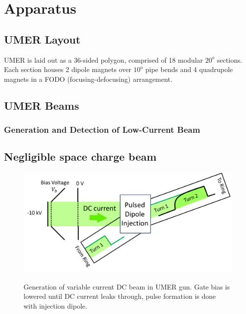 
\renewcommand{\thechapter}{3}

\chapter{Apparatus}
\label{ch:apparatus}

\section{UMER Layout}

UMER is laid out as a 36-sided polygon, comprised of 18 modular $20^o$ sections. Each section houses 2 dipole magnets over $10^o$ pipe bends and 4 quadrupole magnets in a FODO (focusing-defocusing) arrangement.

\section{UMER Beams}
	\subsection{Generation and Detection of Low-Current Beam}
	
	\section{Negligible space charge beam}

\begin{figure}
\begin{center}
\includegraphics[width=\textwidth]{3.figures/DCbeam.png}
\end{center}
\renewcommand{\baselinestretch}{1}
\small\normalsize
\begin{quote}
\caption[]{Generation of variable current DC beam in UMER gun. Gate bias is lowered until DC current leaks through, pulse formation is done with injection dipole.}
\label{fig:DCbeamcartoon}
\end{quote}
\end{figure} 
\renewcommand{\baselinestretch}{2}
\small\normalsize
	

